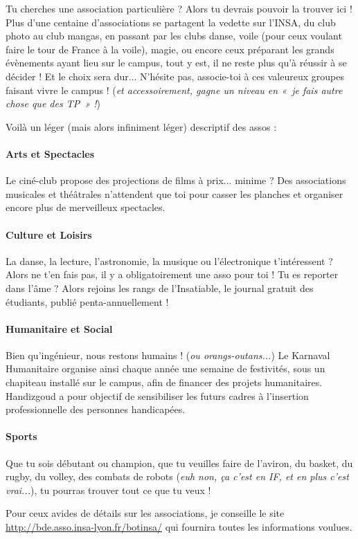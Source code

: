 Tu cherches une association particulière ? Alors tu devrais pouvoir la trouver ici !
Plus d'une centaine d'associations se partagent la vedette sur l'INSA, du club photo au club mangas, en
passant par les clubs danse, voile (pour ceux
voulant faire le tour de France à la voile), magie, ou encore ceux
préparant les grands évènements ayant lieu sur le campus, tout y est, il ne
reste plus qu'à réussir à se décider ! Et le choix sera dur...
N'hésite pas, associe-toi à ces valeureux groupes faisant vivre le campus ! (\emph{et accessoirement, gagne un niveau en «~je fais autre chose que
des TP~» !})

\vspace{1em}

Voilà un léger (mais alors infiniment léger) descriptif des assos :

\paragraph{Arts et Spectacles}
Le ciné-club propose des projections de films à prix... minime ?
Des associations musicales et théâtrales n'attendent que toi pour casser les planches et organiser encore plus de merveilleux spectacles.

\paragraph{Culture et Loisirs}
La danse, la lecture, l'astronomie, la musique ou l'électronique t'intéressent ?
Alors ne t'en fais pas, il y a obligatoirement une asso pour toi !
Tu es reporter dans l'âme ? Alors rejoins les rangs de l'Insatiable, le journal gratuit des étudiants, publié penta-annuellement !

\paragraph{Humanitaire et Social}
Bien qu'ingénieur, nous restons humains ! (\emph{ou orangs-outans...})
Le Karnaval Humanitaire organise ainsi chaque année une semaine de festivités,
sous un chapiteau installé sur le campus, afin de financer des projets
humanitaires.
Handizgoud a pour objectif de sensibiliser les futurs cadres à l'insertion
professionnelle des personnes handicapées.

\paragraph{Sports}
Que tu sois débutant ou champion, que tu veuilles faire de l'aviron, du
basket, du rugby, du volley, des combats de robots (\emph{euh non, ça
c'est en IF, et en plus c'est vrai...}), tu pourras trouver tout ce que tu veux !

\vspace{1em}

Pour ceux avides de détails sur les associations, je conseille le site 
\url{http://bde.asso.insa-lyon.fr/botinsa/} qui fournira toutes les
informations voulues.

